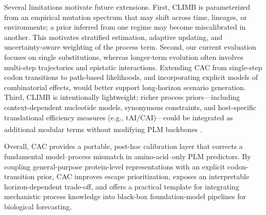 \documentclass[pdflatex,sn-nature]{sn-jnl}
\renewcommand\cite[1]{\unskip\textsuperscript{\citep{#1}}}
\begin{document}
Several limitations motivate future extensions. First, CLIMB is parameterized from an empirical mutation spectrum that may shift across time, lineages, or environments; a prior inferred from one regime may become miscalibrated in another. This motivates stratified estimation, adaptive updating, and uncertainty-aware weighting of the process term. Second, our current evaluation focuses on single substitutions, whereas longer-term evolution often involves multi-step trajectories and epistatic interactions. Extending CAC from single-step codon transitions to path-based likelihoods, and incorporating explicit models of combinatorial effects, would better support long-horizon scenario generation. Third, CLIMB is intentionally lightweight; richer process priors---including context-dependent nucleotide models, synonymous constraints, and host-specific translational efficiency measures (e.g., tAI/CAI)---could be integrated as additional modular terms without modifying PLM backbones \cite{Plotkin2010Synonymous, Shao2024Riboformer, Wu2024Genome, Rapino2021Wobble, Zhang2023Algorithm}.

Overall, CAC provides a portable, post-hoc calibration layer that corrects a fundamental model--process mismatch in amino-acid--only PLM predictors. By coupling general-purpose protein-level representations with an explicit codon-transition prior, CAC improves escape prioritization, exposes an interpretable horizon-dependent trade-off, and offers a practical template for integrating mechanistic process knowledge into black-box foundation-model pipelines for biological forecasting.



\end{document}
